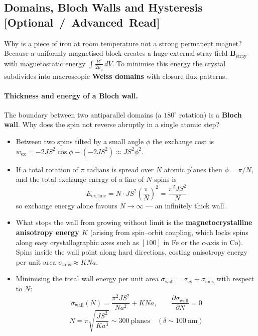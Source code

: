 \documentclass[11pt,a4paper]{article}
\newcommand{\extratag}{\hfill\mbox{\normalfont\footnotesize\sffamily\color{secondary}\textbf{[Optional / Advanced Read]}}}
\newcommand{\vb}[1]{\mathbf{#1}}
\begin{document}
\subsection[Domains, Bloch Walls and Hysteresis (Optional Read)]{Domains, Bloch Walls and Hysteresis \extratag}

Why is a piece of iron at room temperature not a strong permanent magnet? Because a uniformly magnetised block creates a huge external stray field $\vb{B}_{\mathrm{stray}}$ with magnetostatic energy $\int\frac{B^2}{2\mu_0}\,dV$. To minimise this energy the crystal subdivides into macroscopic \textbf{Weiss domains} with closure flux patterns.

\paragraph{Thickness and energy of a Bloch wall.}
The boundary between two antiparallel domains (a $180^\circ$ rotation) is a \textbf{Bloch wall}. Why does the spin not reverse abruptly in a single atomic step?
\begin{itemize}[leftmargin=1.6cm]
    \item Between two spins tilted by a small angle $\phi$ the exchange cost is $w_{\mathrm{ex}} = -2JS^2\cos\phi - (-2JS^2)\approx JS^2\phi^2$.
    \item If a total rotation of $\pi$ radians is spread over $N$ atomic planes then $\phi = \pi/N$, and the total exchange energy of a line of $N$ spins is
    \begin{equation}
        E_{\mathrm{ex,line}} = N\cdot JS^2\left(\frac{\pi}{N}\right)^2 = \frac{\pi^2JS^2}{N}
        \label{eq:wallex}
    \end{equation}
    so exchange energy alone favours $N\to\infty$ --- an infinitely thick wall.
    \item What stops the wall from growing without limit is the \textbf{magnetocrystalline anisotropy energy $K$} (arising from spin--orbit coupling, which locks spins along easy crystallographic axes such as $[100]$ in Fe or the $c$-axis in Co). Spins inside the wall point along hard directions, costing anisotropy energy per unit area $\sigma_{\mathrm{anis}}\approx KNa$.
    \item Minimising the total wall energy per unit area $\sigma_{\mathrm{wall}} = \sigma_{\mathrm{ex}} + \sigma_{\mathrm{anis}}$ with respect to $N$:
    \begin{equation}
        \sigma_{\mathrm{wall}}(N) = \frac{\pi^2JS^2}{Na^2} + KNa,
        \qquad \frac{\partial\sigma_{\mathrm{wall}}}{\partial N} = 0
        \label{eq:wallwidth}
    \end{equation}
    \begin{equation}
        \boxed{\;N = \pi\sqrt{\frac{JS^2}{Ka^3}} \sim 300\ \text{planes}
        \quad (\delta \sim 100\ \mathrm{nm})\;}
    \end{equation}
\end{itemize}
\end{document}
